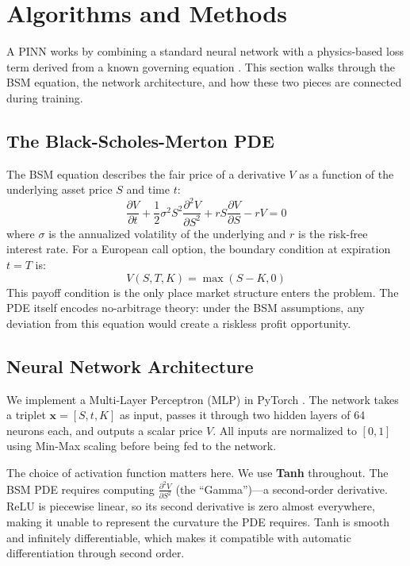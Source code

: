 \documentclass[11pt, twocolumn]{article}
\begin{document}
\section{Algorithms and Methods}
A PINN works by combining a standard neural network with a physics-based loss term derived from a known governing equation \cite{karniadakis2021physics}. This section walks through the BSM equation, the network architecture, and how these two pieces are connected during training.

\subsection{The Black-Scholes-Merton PDE}
The BSM equation describes the fair price of a derivative $V$ as a function of the underlying asset price $S$ and time $t$:
\begin{equation}
\frac{\partial V}{\partial t} + \frac{1}{2} \sigma^2 S^2 \frac{\partial^2 V}{\partial S^2} + rS \frac{\partial V}{\partial S} - rV = 0
\end{equation}
where $\sigma$ is the annualized volatility of the underlying and $r$ is the risk-free interest rate. For a European call option, the boundary condition at expiration $t = T$ is:
\begin{equation}
V(S, T, K) = \max(S - K, 0)
\end{equation}
This payoff condition is the only place market structure enters the problem. The PDE itself encodes no-arbitrage theory: under the BSM assumptions, any deviation from this equation would create a riskless profit opportunity.

\subsection{Neural Network Architecture}
We implement a Multi-Layer Perceptron (MLP) in PyTorch \cite{paszke2019pytorch}. The network takes a triplet $\mathbf{x} = [S, t, K]$ as input, passes it through two hidden layers of 64 neurons each, and outputs a scalar price $V$. All inputs are normalized to $[0, 1]$ using Min-Max scaling before being fed to the network.

The choice of activation function matters here. We use \textbf{Tanh} throughout. The BSM PDE requires computing $\frac{\partial^2 V}{\partial S^2}$ (the ``Gamma'')—a second-order derivative. ReLU is piecewise linear, so its second derivative is zero almost everywhere, making it unable to represent the curvature the PDE requires. Tanh is smooth and infinitely differentiable, which makes it compatible with automatic differentiation through second order.
\end{document}
